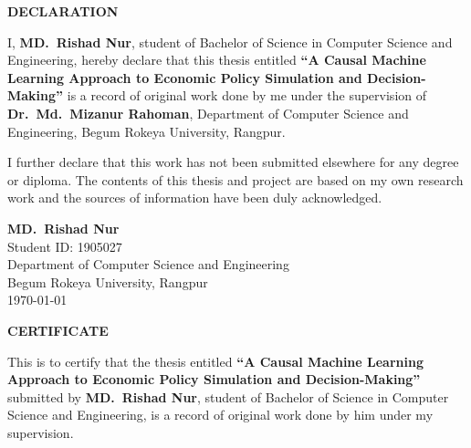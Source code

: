 \newpage
\thispagestyle{empty}
\vspace*{2cm}

\begin{center}
    {\Large\bfseries DECLARATION}
\end{center}

\vspace{1cm}

I, \textbf{MD.\ Rishad Nur}, student of Bachelor of Science in Computer Science and Engineering, hereby declare that this thesis entitled \textbf{``A Causal Machine Learning Approach to Economic Policy Simulation and Decision-Making''} is a record of original work done by me under the supervision of \textbf{Dr.\ Md.\ Mizanur Rahoman}, Department of Computer Science and Engineering, Begum Rokeya University, Rangpur.

\vspace{1cm}

I further declare that this work has not been submitted elsewhere for any degree or diploma. The contents of this thesis and project are based on my own research work and the sources of information have been duly acknowledged.

\vspace{3cm}

\begin{flushright}
    \textbf{MD.\ Rishad Nur}\\
    Student ID: 1905027\\
    Department of Computer Science and Engineering\\
    Begum Rokeya University, Rangpur\\
    \today
\end{flushright}

\newpage
\thispagestyle{empty}
\vspace*{2cm}

\begin{center}
    {\Large\bfseries CERTIFICATE}
\end{center}

\vspace{1cm}

This is to certify that the thesis entitled \textbf{``A Causal Machine Learning Approach to Economic Policy Simulation and Decision-Making''} submitted by \textbf{MD.\ Rishad Nur}, student of Bachelor of Science in Computer Science and Engineering, is a record of original work done by him under my supervision.

\vspace{1cm}

